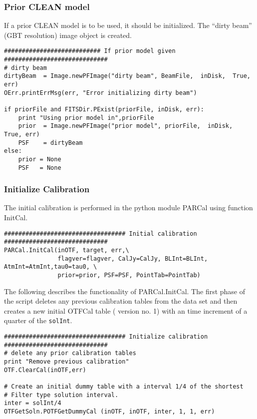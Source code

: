 \documentclass[11pt]{report}
\begin{document}
\subsubsection{Prior CLEAN model}
If a prior CLEAN model is to be used, it should be initialized.
The ``dirty beam'' (GBT resolution) image object is created.
\begin{verbatim}
########################### If prior model given #############################
# dirty beam
dirtyBeam  = Image.newPFImage("dirty beam", BeamFile,  inDisk,  True, err)
OErr.printErrMsg(err, "Error initializing dirty beam")

if priorFile and FITSDir.PExist(priorFile, inDisk, err):
    print "Using prior model in",priorFile
    prior  = Image.newPFImage("prior model", priorFile,  inDisk,  True, err)
    PSF    = dirtyBeam
else:
    prior = None
    PSF   = None
\end{verbatim}

\subsubsection{Initialize Calibration}
The initial calibration is performed in the python module PARCal
using function InitCal.
\begin{verbatim}
################################## Initial calibration #############################
PARCal.InitCal(inOTF, target, err,\
               flagver=flagver, CalJy=CalJy, BLInt=BLInt, AtmInt=AtmInt,tau0=tau0, \
               prior=prior, PSF=PSF, PointTab=PointTab)
\end{verbatim}

The following describes the functionality of PARCal.InitCal.
The first phase of the script deletes any previous calibration tables from
the data set and then creates a new initial OTFCal table ( version
no. 1) with an time increment  of a quarter of the {\tt solInt}.
\begin{verbatim}
################################## Initialize calibration #############################
# delete any prior calibration tables
print "Remove previous calibration"
OTF.ClearCal(inOTF,err)

# Create an initial dummy table with a interval 1/4 of the shortest
# Filter type solution interval.
inter = solInt/4
OTFGetSoln.POTFGetDummyCal (inOTF, inOTF, inter, 1, 1, err)

\end{verbatim}
\end{document}
